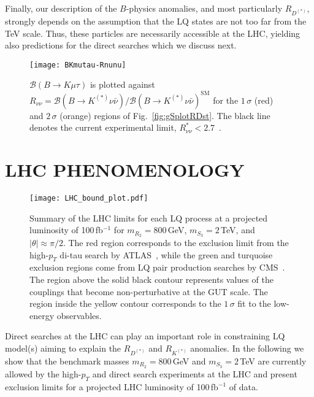 \documentclass[aps,prd,superscriptaddress,twocolumn,secnumarabic]{revtex4-1}
\begin{document}
Finally, our description of the $B$-physics anomalies, and most particularly $R_{D^{(\ast)}}$, strongly depends  on the assumption that the LQ states are not too far from the TeV scale. Thus, these particles are necessarily accessible at the LHC, yielding also predictions for the direct searches which we discuss next.

\begin{figure}[!htbp]
  \texttt{[image: BKmutau-Rnunu]}
  \caption{$\mathcal{B}(B\to K \mu \tau)$ is plotted against $R_{\nu\nu}=\mathcal{B}(B\to K^{(\ast)} \nu \bar{\nu})/\mathcal{B}(B\to K^{(\ast)} \nu \bar{\nu})^{\mathrm{SM}}$ for the $1\,\sigma$ (red) and $2\,\sigma$ (orange) regions of Fig.~\ref{fig:gSplotRDst}. The black line denotes the current experimental limit, $R_{\nu\nu}^{\ast}<2.7$~\cite{Grygier:2017tzo}.}
  \label{fig:prediction}
\end{figure}

\section{LHC PHENOMENOLOGY}
\label{sec:LHC}

\begin{figure}[t]
\begin{center}
 \texttt{[image: LHC\_bound\_plot.pdf]}
 \vspace{-0.5cm}
\end{center}
\caption{Summary of the LHC limits for each LQ process at a projected luminosity of 100\,fb$^{-1}$ for $m_{R_2}=800$\,GeV, $m_{S_3}=2$\,TeV, and $|\theta| \approx\pi/2$. The red region corresponds to the exclusion limit from the high-$p_T$ di-tau search by ATLAS~\cite{Aaboud:2017sjh}, while the green and turquoise exclusion regions come from LQ pair production searches by CMS~\cite{Sirunyan:2017yrk,CMS:2017kmd,Sirunyan:2018nkj}. The region above the solid black contour represents values of the couplings that become non-perturbative at the GUT scale. The region inside the yellow contour corresponds to the $1\,\sigma$ fit to the low-energy observables. }
\label{fig:LHCbound}
\end{figure}

Direct searches at the LHC can play an important role in constraining LQ model(s) aiming to explain the $R_{D^{(*)}}$ and $R_{K^{(*)}}$ anomalies. In the following we show that the benchmark masses $m_{R_2}=800$\,GeV and $m_{S_3}=2$\,TeV are currently allowed by the high-$p_T$ and direct search experiments at the LHC and present exclusion limits for a projected LHC luminosity of 100\,fb$^{-1}$ of data. 
\end{document}
